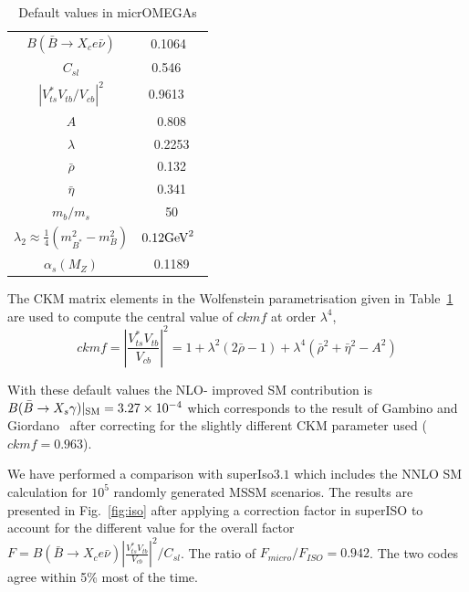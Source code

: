 \documentclass[12pt,a4paper]{article}
\begin{document}
{\begin{table}
\begin{center}
\begin{tabular}{|c|c|}
\hline
$B(\bar{B}\rightarrow X_c e\bar\nu)$ & 0.1064~\cite{Nakamura:2010zzi}\\
$C_{sl}$ & 0.546 ~\cite{Gambino:2008fj}\\
$|V_{ts}^*V_{tb}/V_{cb}|^2$ & 0.9613 ~\cite{Nakamura:2010zzi}\\
$A$& 0.808\\
$\lambda$ & 0.2253\\
$\bar{\rho}$ & 0.132\\
$\bar{\eta}$ &0.341 \\
$m_b/m_s$  & 50\\
$\lambda_2\approx \frac{1}{4} (m^2_{B^*}-m^2_B)$ &  $0.12 {\rm GeV}^2$~\cite{Yao:2006px}\\
$\alpha_s(M_Z)$ &0.1189 \\\hline
\end{tabular}
\caption{Default values in micrOMEGAs }
\end{center}
\label{tab:def}
\end{table}

The CKM matrix elements in the Wolfenstein parametrisation given in Table~\ref{tab:def}
are used to compute the central value of $ckmf$  at order $\lambda^4$,
\begin{equation}
ckmf=\left|\frac{V_{ts}^*V_{tb}}{V_{cb}}\right|^2=1+\lambda^2 (2\bar{\rho}-1) +
\lambda^4 (\bar\rho^2+\bar\eta^2-A^2)
\end{equation}

With these default values  the NLO- improved SM contribution 
is $B(\bar{B}\rightarrow X_s \gamma)|_{\rm SM}=3.27\times 10^{-4}$ which corresponds to the result of Gambino
and Giordano~\cite{Gambino:2008fj} after correcting for the slightly different CKM parameter used ($ckmf=0.963$).

We have performed a comparison with superIso$3.1$ which includes the NNLO SM calculation for 
$10^5$ randomly generated MSSM scenarios. The results are presented in Fig.~\ref{fig:iso}  after applying a
correction factor in superISO to account for the different value for the overall factor
$F=B(\bar{B}\rightarrow X_c e\bar\nu) \left|\frac{V_{ts}^* V_{tb}}
{V_{cb}}\right|^2/C_{sl}$. The ratio of $F_{micro}/F_{ISO}=0.942$.
The two codes agree within 5\% most of the time. 

}
\end{document}
